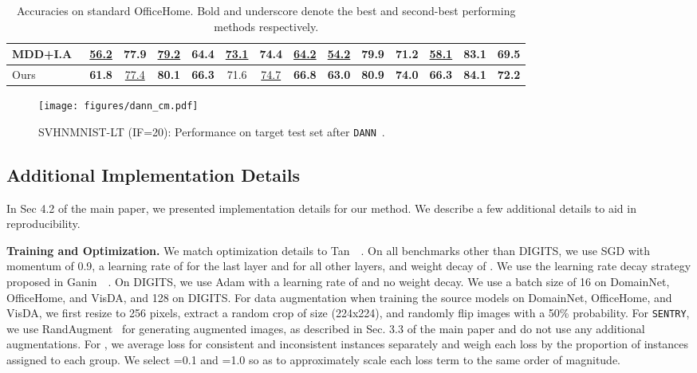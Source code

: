 \documentclass[10pt,twocolumn,letterpaper]{article}
\newcommand{\method}{\texttt{SENTRY}\xspace}
\begin{document}
\begin{table*}[t]
\begin{center}
{\begin{tabular}{lccccccccccccc}
    MDD+I.A~\cite{jiang2020implicit} & \underline{56.2} & \textbf{77.9} & \underline{79.2} & 64.4 & \underline{73.1} & 74.4 & \underline{64.2} & \underline{54.2} & 79.9 & 71.2 & \underline{58.1} & 83.1 & 69.5 \\    
    \midrule
    Ours & \textbf{61.8} & \underline{77.4} & \textbf{80.1} & \textbf{66.3} & 71.6 & \underline{74.7} & \textbf{66.8} & \textbf{63.0} & \textbf{80.9} & \textbf{74.0} & \textbf{66.3} & \textbf{84.1} & \textbf{72.2} \\
    \bottomrule
    \end{tabular}}
    \caption{Accuracies on standard OfficeHome. Bold and underscore denote the best and second-best performing methods respectively.}
    \label{tab:officehome_std}
    \end{center}
\end{table*}


\begin{figure*}[t]
    \centering
    \texttt{[image: figures/dann\_cm.pdf]}
    \caption{
        SVHNMNIST-LT (IF=20): Performance on target test set after \texttt{DANN}~\cite{ganin2014unsupervised}.
    }
    \label{fig:dann_cm}
 \end{figure*}

\subsection{Additional Implementation Details} 

In Sec 4.2 of the main paper, we presented implementation details for our method. We describe a few additional details to aid in reproducibility.


\noindent \textbf{Training and Optimization.} We match optimization details to Tan~\etal~\cite{tan2019generalized}. On all benchmarks other than DIGITS, we use SGD with momentum of 0.9, a learning rate of  for the last layer and  for all other layers, and weight decay of . We use the learning rate decay strategy proposed in Ganin~\etal~\cite{ganin2014unsupervised}. On DIGITS, we use Adam with a learning rate of  and no weight decay. We use a batch size of 16 on DomainNet, OfficeHome, and VisDA, and 128 on DIGITS. For data augmentation when training the source models on DomainNet, OfficeHome, and VisDA, we first resize to 256 pixels, extract a random crop of size (224x224), and randomly flip images with a 50\% probability. For \method, we use RandAugment~\cite{cubuk2020randaugment} for generating augmented images, as described in Sec. 3.3 of the main paper and do not use any additional augmentations. For , we average loss for consistent and inconsistent instances separately and weigh each loss by the proportion of instances assigned to each group. We select =0.1 and =1.0 so as to approximately scale each loss term to the same order of magnitude.
\end{document}

